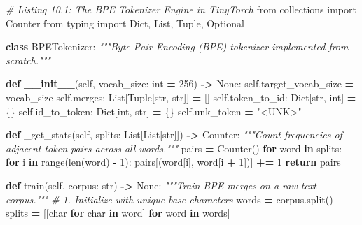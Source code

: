 \documentclass[
  letterpaper,
]{scrbook}
\newenvironment{Shaded}{\begin{snugshade}}{\end{snugshade}}
\newcommand{\BuiltInTok}[1]{#1}
\newcommand{\CommentTok}[1]{\textcolor[rgb]{0.56,0.35,0.01}{\textit{#1}}}
\newcommand{\ControlFlowTok}[1]{\textcolor[rgb]{0.13,0.29,0.53}{\textbf{#1}}}
\newcommand{\DecValTok}[1]{\textcolor[rgb]{0.00,0.00,0.81}{#1}}
\newcommand{\FunctionTok}[1]{\textcolor[rgb]{0.13,0.29,0.53}{\textbf{#1}}}
\newcommand{\ImportTok}[1]{#1}
\newcommand{\KeywordTok}[1]{\textcolor[rgb]{0.13,0.29,0.53}{\textbf{#1}}}
\newcommand{\NormalTok}[1]{#1}
\newcommand{\OperatorTok}[1]{\textcolor[rgb]{0.81,0.36,0.00}{\textbf{#1}}}
\newcommand{\StringTok}[1]{\textcolor[rgb]{0.31,0.60,0.02}{#1}}
\newcommand{\VariableTok}[1]{\textcolor[rgb]{0.00,0.00,0.00}{#1}}
\begin{document}
\begin{Shaded}
\begin{Highlighting}[]
\CommentTok{\# Listing 10.1: The BPE Tokenizer Engine in TinyTorch}
\ImportTok{from}\NormalTok{ collections }\ImportTok{import}\NormalTok{ Counter}
\ImportTok{from}\NormalTok{ typing }\ImportTok{import}\NormalTok{ Dict, List, Tuple, Optional}

\KeywordTok{class}\NormalTok{ BPETokenizer:}
    \CommentTok{"""Byte{-}Pair Encoding (BPE) tokenizer implemented from scratch."""}

    \KeywordTok{def} \FunctionTok{\_\_init\_\_}\NormalTok{(}\VariableTok{self}\NormalTok{, vocab\_size: }\BuiltInTok{int} \OperatorTok{=} \DecValTok{256}\NormalTok{) }\OperatorTok{{-}\textgreater{}} \VariableTok{None}\NormalTok{:}
        \VariableTok{self}\NormalTok{.target\_vocab\_size }\OperatorTok{=}\NormalTok{ vocab\_size}
        \VariableTok{self}\NormalTok{.merges: List[Tuple[}\BuiltInTok{str}\NormalTok{, }\BuiltInTok{str}\NormalTok{]] }\OperatorTok{=}\NormalTok{ []}
        \VariableTok{self}\NormalTok{.token\_to\_id: Dict[}\BuiltInTok{str}\NormalTok{, }\BuiltInTok{int}\NormalTok{] }\OperatorTok{=}\NormalTok{ \{\}}
        \VariableTok{self}\NormalTok{.id\_to\_token: Dict[}\BuiltInTok{int}\NormalTok{, }\BuiltInTok{str}\NormalTok{] }\OperatorTok{=}\NormalTok{ \{\}}
        \VariableTok{self}\NormalTok{.unk\_token }\OperatorTok{=} \StringTok{"\textless{}UNK\textgreater{}"}

    \KeywordTok{def}\NormalTok{ \_get\_stats(}\VariableTok{self}\NormalTok{, splits: List[List[}\BuiltInTok{str}\NormalTok{]]) }\OperatorTok{{-}\textgreater{}}\NormalTok{ Counter:}
        \CommentTok{"""Count frequencies of adjacent token pairs across all words."""}
\NormalTok{        pairs }\OperatorTok{=}\NormalTok{ Counter()}
        \ControlFlowTok{for}\NormalTok{ word }\KeywordTok{in}\NormalTok{ splits:}
            \ControlFlowTok{for}\NormalTok{ i }\KeywordTok{in} \BuiltInTok{range}\NormalTok{(}\BuiltInTok{len}\NormalTok{(word) }\OperatorTok{{-}} \DecValTok{1}\NormalTok{):}
\NormalTok{                pairs[(word[i], word[i }\OperatorTok{+} \DecValTok{1}\NormalTok{])] }\OperatorTok{+=} \DecValTok{1}
        \ControlFlowTok{return}\NormalTok{ pairs}

    \KeywordTok{def}\NormalTok{ train(}\VariableTok{self}\NormalTok{, corpus: }\BuiltInTok{str}\NormalTok{) }\OperatorTok{{-}\textgreater{}} \VariableTok{None}\NormalTok{:}
        \CommentTok{"""Train BPE merges on a raw text corpus."""}
        \CommentTok{\# 1. Initialize with unique base characters}
\NormalTok{        words }\OperatorTok{=}\NormalTok{ corpus.split()}
\NormalTok{        splits }\OperatorTok{=}\NormalTok{ [[char }\ControlFlowTok{for}\NormalTok{ char }\KeywordTok{in}\NormalTok{ word] }\ControlFlowTok{for}\NormalTok{ word }\KeywordTok{in}\NormalTok{ words]}


\end{Highlighting}
\end{Shaded}
\end{document}
